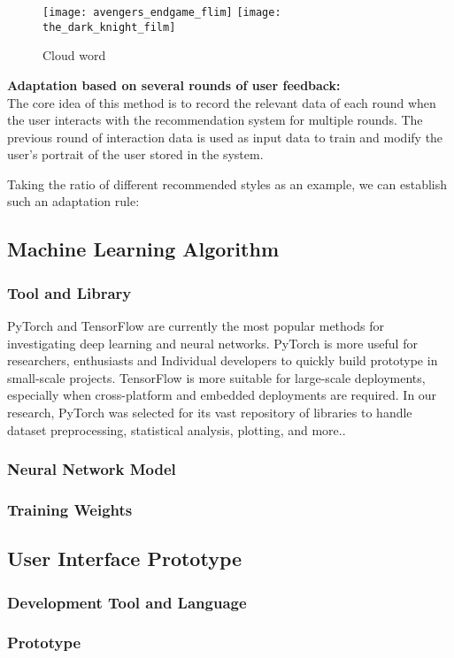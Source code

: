 \begin{figure}[h]
\caption{Cloud word}
\centering
\texttt{[image: avengers\_endgame\_flim]}
\texttt{[image: the\_dark\_knight\_film]}
\end{figure}
\textbf{Adaptation based on several rounds of user feedback:} \\
The core idea of this method is to record the relevant data of each round when the user interacts with the recommendation system for multiple rounds. The previous round of interaction data is used as input data to train and modify the user's portrait of the user stored in the system.
\par Taking the ratio of different recommended styles as an example, we can establish such an adaptation rule:

\subsection{Machine Learning Algorithm}

\subsubsection{Tool and Library}
PyTorch\cite{ketkar2017introduction} and TensorFlow\cite{abadi2016tensorflow} are currently the most popular methods for investigating deep learning and neural networks. PyTorch is more useful for researchers, enthusiasts and Individual developers to quickly build prototype in small-scale projects. TensorFlow is more suitable for large-scale deployments, especially when cross-platform and embedded deployments are required. In our research, PyTorch was selected for its vast repository of libraries to handle dataset preprocessing, statistical analysis, plotting, and more.\cite{paszke2019pytorch}.

\subsubsection{Neural Network Model}
\subsubsection{Training Weights}


\subsection{User Interface Prototype} 

\subsubsection{Development Tool and Language}
\subsubsection{Prototype}
\subsubsection{}

\subsection{}

\cleardoublepage